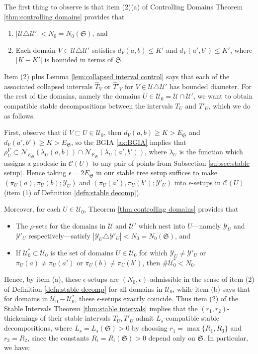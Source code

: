 \documentclass{amsart}
\theoremstyle{definition}
\theoremstyle{remark}
\theoremstyle{definition}
\newcommand{\calC}{\mathcal{C}}
\newcommand{\calN}{\mathcal{N}}
\newcommand{\calU}{\mathcal{U}}
\newcommand{\calY}{\mathcal{Y}}
\newcommand{\hT}{\widehat{T}}
\newcommand{\ES}{E_{\mathfrak S}}
\newcommand{\nest}{\sqsubset}
\begin{document}
The first thing to observe is that item (2)(a) of Controlling Domains Theorem \ref{thm:controlling domains} provides that 
\begin{enumerate}
\item $|\calU \triangle \calU'|<N_0 = N_0(\mathfrak S)$, and
\item Each domain $V \in \calU \triangle \calU'$ satisfies $d_V(a,b) \leq K'$ and $d_V(a',b') \leq K'$, where $|K-K'|$ is bounded in terms of $\mathfrak S$.
\end{enumerate}

Item (2) plus Lemma \ref{lem:collapsed interval control} says that each of the associated collapsed intervals $\hT_V$ or $\hT'_V$ for $V\in \calU \triangle \calU'$ has bounded diameter.  For the rest of the domains, namely the domains $U \in \calU_0 = \calU \cap \calU'$, we want to obtain compatible stable decompositions between the intervals $T_U$ and $T'_U$, which we do as follows.

First, observe that if $V \nest U \in \calU_0$, then $d_V(a,b)\geq K>\ES$ and $d_V(a',b') \geq K> \ES$, so the BGIA \ref{ax:BGIA} implies that $\rho^V_U \subset \calN_{\ES}(\lambda_U(a,b)) \cap \calN_{\ES}(\lambda_U(a',b'))$, where $\lambda_U$ is the function which assigns a geodesic in $\calC(U)$ to any pair of points from Subsection \ref{subsec:stable setup}.  Hence taking $\epsilon = 2\ES$ in our stable tree setup suffices to make $(\pi_U(a),\pi_U(b);\calY_U)$ and $(\pi_U(a'),\pi_U(b');\calY'_U)$ into $\epsilon$-setups in $\calC(U)$ (item (1) of Definition \ref{defn:stable decomp}).

Moreover, for each $U \in \calU_0$, Theorem \ref{thm:controlling domains} provides that 
\begin{itemize}
\item[(a)] The $\rho$-sets for the domains in $\calU$ and $\calU'$ which nest into $U$---namely $\calY_U$ and $\calY'_U$ respectively---satisfy $|\calY_U \triangle \calY'_U| < N_0 = N_0(\mathfrak S)$, and
\item[(b)] If $\calU^*_0 \subset \calU_0$ is the set of domains $U \in \calU_0$ for which $\calY_U \neq \calY'_U$ or $\pi_U(a) \neq \pi_U(a')$ or $\pi_U(b) \neq \pi_U(b')$, then $\#\calU^*_0 < N_0$.
\end{itemize}

Hence, by item (a), these $\epsilon$-setups are $(N_0, \epsilon)$-admissible in the sense of item (2) of Definition \ref{defn:stable decomp} for all domains in $\calU_0$, while item (b) says that for domains in $\calU_0 - \calU^*_0$, these $\epsilon$-setups exactly coincide.  Thus item (2) of the Stable Intervals Theorem \ref{thm:stable intervals} implies that the $(r_1,r_2)$-thickenings of their stable intervals $T_U, T'_U$ admit $L_s$-compatible stable decompositions, where $L_s=L_s(\mathfrak S)>0$ by choosing $r_1 = \max\{R_1,R_3\}$ and $r_2 = R_2$, since the constants $R_i = R_i(\mathfrak S)>0$ depend only on $\mathfrak S$.  In particular, we have:
\end{document}
